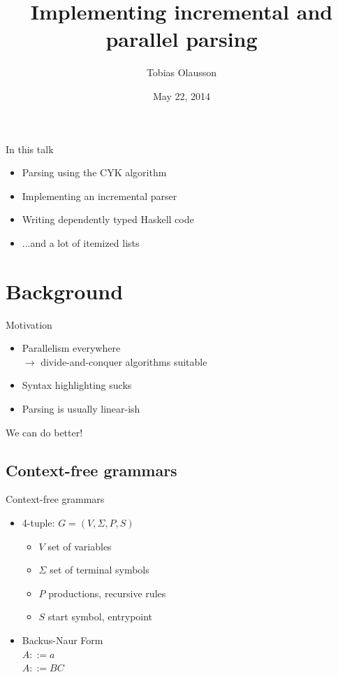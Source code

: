 \documentclass{beamer}
\title{Implementing incremental and parallel parsing}
\author{Tobias Olausson}
\institute{University of Gothenburg}
\date{May 22, 2014}
\begin{document}
\begin{frame}
\titlepage
\end{frame}

\begin{frame}{In this talk}
    \begin{itemize}
        \item Parsing using the CYK algorithm
        \item Implementing an incremental parser
        \item Writing dependently typed Haskell code
        \item ...and a lot of itemized lists
    \end{itemize}
\end{frame}

\section{Background}
\begin{frame}{Motivation}
    \begin{itemize}
        \item Parallelism everywhere \\
              $\rightarrow$ divide-and-conquer algorithms suitable
        \item Syntax highlighting sucks
        \item Parsing is usually linear-ish
    \end{itemize}
    We can do better!
\end{frame}

\subsection{Context-free grammars}
\begin{frame}{Context-free grammars}
    \begin{itemize}
        \item 4-tuple: $G = (V, \Sigma, P, S)$
        \begin{itemize}
            \item $V$ set of variables
            \item $\Sigma$ set of terminal symbols
            \item $P$ productions, recursive rules
            \item $S$ start symbol, entrypoint
        \end{itemize}
        \item Backus-Naur Form \\
              $A ::= a$ \\ 
              $A ::= BC$
    \end{itemize}
\end{frame}
\end{document}
